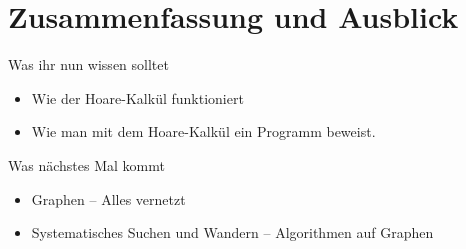 
% 


\appendix
\beginbackup

\section{Zusammenfassung und Ausblick}

\begin{frame}
	\begin{block}{Was ihr nun wissen solltet}
		\begin{itemize}
			\item Wie der Hoare-Kalkül funktioniert
			\item Wie man mit dem Hoare-Kalkül ein Programm beweist.
		\end{itemize}
	\end{block}
	
	\begin{block}{Was nächstes Mal kommt}
		\begin{itemize}
			\item Graphen -- Alles vernetzt
			\item Systematisches Suchen und Wandern -- Algorithmen auf Graphen
		\end{itemize}
	\end{block}
\end{frame}






\backupend
